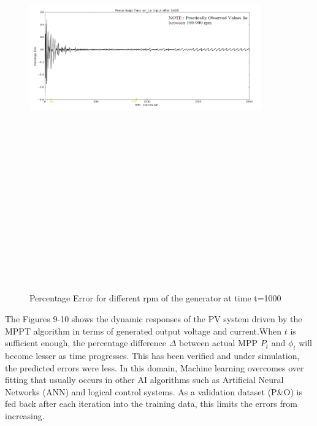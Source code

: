 \begin{center}
\begin{figure}
\includegraphics[width=10cm,height=20cm,keepaspectratio]{8.png}
\caption{ Percentage Error for different rpm of the generator at time t=1000}
\label{Fig:8}    
\end{figure}
\end{center}

The Figures 9-10 shows the dynamic responses of the PV system driven by the MPPT algorithm in terms of generated output voltage and current.When $t$ is sufficient enough, the percentage difference $\Delta$  between actual MPP $P_t$ and $\phi_t$  will become lesser as time progresses. This has been verified and under simulation, the predicted errors were less. In this domain, Machine learning overcomes over fitting that usually occurs in other AI algorithms such as Artificial Neural Networks (ANN) and logical control systems. As a validation dataset (P\&O) is fed back after each iteration into the training data, this limits the errors from increasing.


